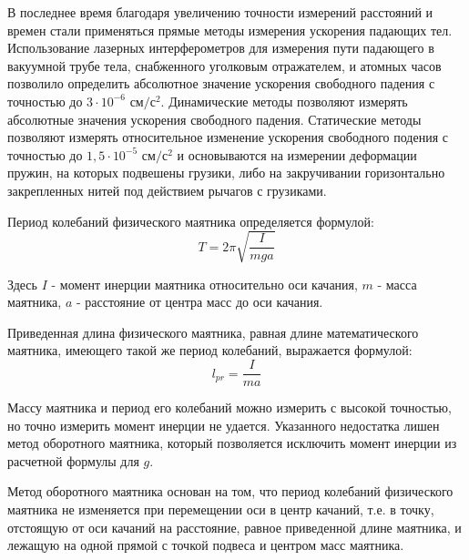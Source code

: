 \documentclass[12pt,a4paper]{article}
\begin{document}
В последнее время благодаря увеличению точности измерений расстояний и времен стали применяться прямые методы измерения ускорения падающих тел. Использование лазерных интерферометров для измерения пути падающего в вакуумной трубе тела, снабженного уголковым отражателем, и атомных часов позволило определить абсолютное значение ускорения свободного падения с точностью до $3\cdot10^{-6}$ $\textit{см}/\textit{с}^2$. Динамические методы позволяют измерять абсолютные значения ускорения свободного падения. Статические методы позволяют измерять относительное изменение ускорения свободного подения с точностью до $1,5\cdot10^{-5}$ $\textit{см}/\textit{с}^2$ и основываются на измерении деформации пружин, на которых подвешены грузики, либо на закручивании горизонтально закрепленных нитей под действием рычагов с грузиками.

Период колебаний физического маятника определяется формулой:
\begin{equation}\label{3}
    T = 2\pi\sqrt{\frac{I}{mga}}
\end{equation}

Здесь $I$ - момент инерции маятника относительно оси качания, $m$ - масса маятника, $a$ - расстояние от центра масс до оси качания.

Приведенная длина физического маятника, равная длине математического маятника, имеющего такой же период колебаний, выражается формулой:
\begin{equation}\label{4}
    l_{pr} = \frac{I}{ma}
\end{equation}

Массу маятника и период его колебаний можно измерить с высокой точностью, но точно измерить момент инерции не удается. Указанного недостатка лишен метод оборотного маятника, который позволяется исключить момент инерции из расчетной формулы для $g$.

Метод оборотного маятника основан на том, что период колебаний физического маятника не изменяется при перемещении оси в центр качаний, т.е. в точку, отстоящую от оси качаний на расстояние, равное приведенной длине маятника, и лежащую на одной прямой с точкой подвеса и центром масс маятника.
\end{document}
